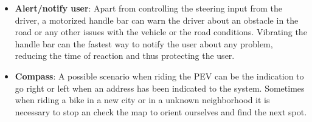 \begin{itemize}
\begin{itemize}
	\item \textbf{Alert/notify user}: Apart from controlling the steering input from the driver, a motorized handle bar can warn the driver about an obstacle in the road or any other issues with the vehicle or the road conditions. Vibrating the handle bar can the fastest way to notify the user about any problem, reducing the time of reaction and thus protecting the user.
	
	\item \textbf{Compass}: A possible scenario when riding the PEV can be the indication to go right or left when an address has been indicated to the system. Sometimes when riding a bike in a new city or in a unknown neighborhood it is necessary to stop an check the map to orient ourselves and find the next spot.
\end{itemize}
\end{itemize}
\newpage

